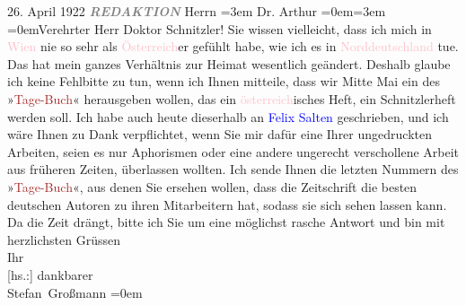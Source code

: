            \pstart
           \centering{}26. April 1922\pend
           \pstart
           \textcolor{gray}{\textbf{\emph{REDAKTION}}}\pend
           \pstart
           Herrn\pend
           \leftskip=3em{}\pstart
           \noindent{}Dr. Arthur \pend
           \leftskip=0em{}\leftskip=3em{}\pstart
           \textcolor{pink}{}{}\ledrightnote{\textcolor{pink}{Wien}}\pend
           \leftskip=0em{}\pstart\center{}Verehrter Herr \introOben{}Doktor\introOben{}
                  Schnitzler!\pend\pstart
           Sie wissen vielleicht, dass ich mich in \textcolor{pink}{Wien}{}\ledrightnote{\textcolor{pink}{Wien}} nie so
               sehr als \textcolor{pink}{Österreich}{}\ledrightnote{\textcolor{pink}{Österreich}}er gefühlt habe, wie ich es in
                  \textcolor{pink}{Norddeutschland}{}\ledrightnote{\textcolor{pink}{Deutschland}} tue. Das hat mein ganzes
               Verhältnis zur Heimat wesentlich geändert. Deshalb glaube ich keine Fehlbitte zu tun,
               wenn ich Ihnen mitteile, dass wir Mitte Mai ein \label{K_L02378_1v}\label{K_L02378_1h} des »\textcolor{brown}{Tage-Buch}{}\ledrightnote{\textcolor{brown}{Das Tage-Buch}}«
               herausgeben wollen, das ein \textcolor{pink}{österreich}{}\ledrightnote{\textcolor{pink}{Österreich}}isches Heft,
               ein Schnitzlerheft werden soll. Ich habe auch heute dieserhalb an \textcolor{blue}{Felix Salten}{}\ledrightnote{\textcolor{blue}{Felix Salten}} geschrieben, und ich wäre Ihnen zu Dank
               verpflichtet, wenn Sie mir dafür eine Ihrer ungedruckten Arbeiten, seien es nur
               Aphorismen oder eine andere ungerecht verschollene Arbeit aus früheren Zeiten,
               überlassen wollten. Ich sende Ihnen die letzten Nummern des »\textcolor{brown}{Tage-Buch}{}\ledrightnote{\textcolor{brown}{Das Tage-Buch}}«, aus denen Sie ersehen wollen, dass die Zeitschrift die
               besten deutschen Autoren zu ihren Mitarbeitern hat, sodass sie sich sehen lassen
               kann.\pend
           \pstart
           {\pb}Da die Zeit drängt, bitte ich Sie um eine
               möglichst rasche Antwort und bin\pend
           \pstart
           mit herzlichsten Grüssen{\\[\baselineskip]}Ihr{\\[\baselineskip]}{[}hs.:{]} dankbarer{\\[\baselineskip]}\spacefill\mbox{Stefan Großmann}\pend
           \leftskip=0em{}\endnumbering{}  
      